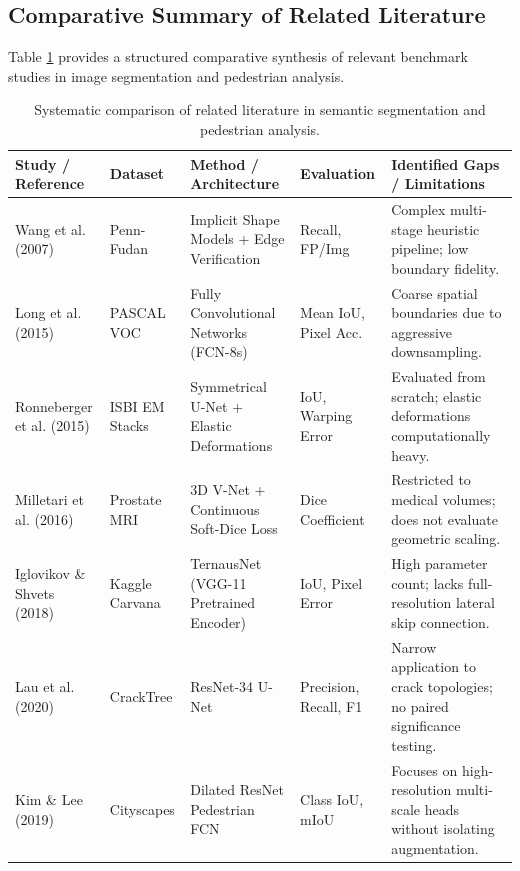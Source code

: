 \documentclass[10pt,a4paper]{article}
\begin{document}
\subsection{Comparative Summary of Related Literature}
Table \ref{tab:lit_review} provides a structured comparative synthesis of relevant benchmark studies in image segmentation and pedestrian analysis.

\begin{table}[htbp]
\centering
\scriptsize
\setlength{\tabcolsep}{3.5pt}
\caption{Systematic comparison of related literature in semantic segmentation and pedestrian analysis.}
\label{tab:lit_review}
\begin{tabularx}{\linewidth}{>{\raggedright\arraybackslash}p{2.6cm} >{\raggedright\arraybackslash}p{1.7cm} >{\raggedright\arraybackslash}p{2.8cm} >{\raggedright\arraybackslash}p{2.1cm} X}
\toprule
\textbf{Study / Reference} & \textbf{Dataset} & \textbf{Method / Architecture} & \textbf{Evaluation} & \textbf{Identified Gaps / Limitations} \\
\midrule
Wang et al. (2007) \cite{wang2007object} & Penn-Fudan & Implicit Shape Models + Edge Verification & Recall, FP/Img & Complex multi-stage heuristic pipeline; low boundary fidelity. \\
Long et al. (2015) \cite{long2015fully} & PASCAL VOC & Fully Convolutional Networks (FCN-8s) & Mean IoU, Pixel Acc. & Coarse spatial boundaries due to aggressive downsampling. \\
Ronneberger et al. (2015) \cite{ronneberger2015unet} & ISBI EM Stacks & Symmetrical U-Net + Elastic Deformations & IoU, Warping Error & Evaluated from scratch; elastic deformations computationally heavy. \\
Milletari et al. (2016) \cite{milletari2016vnet} & Prostate MRI & 3D V-Net + Continuous Soft-Dice Loss & Dice Coefficient & Restricted to medical volumes; does not evaluate geometric scaling. \\
Iglovikov \& Shvets (2018) \cite{iglovikov2018ternausnet} & Kaggle Carvana & TernausNet (VGG-11 Pretrained Encoder) & IoU, Pixel Error & High parameter count; lacks full-resolution lateral skip connection. \\
Lau et al. (2020) \cite{lau2020pavement} & CrackTree & ResNet-34 U-Net & Precision, Recall, F1 & Narrow application to crack topologies; no paired significance testing. \\
Kim \& Lee (2019) \cite{kim2019pedestrian} & Cityscapes & Dilated ResNet Pedestrian FCN & Class IoU, mIoU & Focuses on high-resolution multi-scale heads without isolating augmentation. \\
\bottomrule
\end{tabularx}
\end{table}
\end{document}
